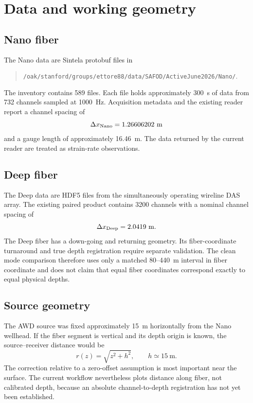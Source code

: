 \documentclass[11pt]{article}
\newcommand{\code}[1]{\texttt{#1}}
\begin{document}
\section{Data and working geometry}

\subsection{Nano fiber}

The Nano data are Sintela protobuf files in
\begin{quote}
\code{/oak/stanford/groups/ettore88/data/SAFOD/ActiveJune2026/Nano/}.
\end{quote}
The inventory contains 589 files.  Each file holds approximately 300~s of data
from 732 channels sampled at 1000~Hz.  Acquisition metadata and the existing
reader report a channel spacing of
\[
\Delta x_{\rm Nano}=1.26606202~\mathrm{m}
\]
and a gauge length of approximately 16.46~m.  The data returned by the current
reader are treated as strain-rate observations.

\subsection{Deep fiber}

The Deep data are HDF5 files from the simultaneously operating wireline DAS
array.  The existing paired product contains 3200 channels with a nominal
channel spacing of
\[
\Delta x_{\rm Deep}=2.0419~\mathrm{m}.
\]
The Deep fiber has a down-going and returning geometry.  Its fiber-coordinate
turnaround and true depth registration require separate validation.  The clean
mode comparison therefore uses only a matched 80--440~m interval in fiber
coordinate and does not claim that equal fiber coordinates correspond exactly
to equal physical depths.

\subsection{Source geometry}

The AWD source was fixed approximately 15~m horizontally from the Nano
wellhead.  If the fiber segment is vertical and its depth origin is known, the
source--receiver distance would be
\begin{equation}
r(z)=\sqrt{z^2+h^2}, \qquad h\simeq 15~\mathrm{m}.
\end{equation}
The correction relative to a zero-offset assumption is most important near
the surface.  The current workflow nevertheless plots distance along fiber,
not calibrated depth, because an absolute channel-to-depth registration has
not yet been established.
\end{document}
